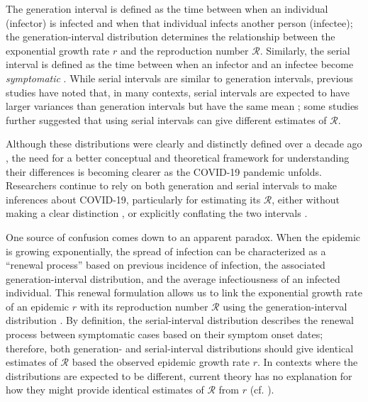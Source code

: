 \documentclass[12pt]{article}
\newcommand{\RR}{\ensuremath{{\mathcal R}}\xspace}
\begin{document}
The generation interval is defined as the time between when an individual (infector) is infected and when that individual infects another person (infectee);
the generation-interval distribution determines the relationship between the exponential growth rate $r$ and the reproduction number \RR \citep{anderson1991infectious, ferguson2005strategies, wallinga2007generation}.
Similarly, the serial interval is defined as the time between when an infector and an infectee become \emph{symptomatic} \citep{svensson2007note}.
While serial intervals are similar to generation intervals, previous studies have noted that, in many contexts, serial intervals are expected to have larger variances than generation intervals but have the same mean \citep{svensson2007note,klinkenberg2011correlation,te2013estimating,champredon2018equivalence};
some studies further suggested that using serial intervals can give different estimates of \RR \citep{britton2019estimation, ganyani2020estimating}.

Although these distributions were clearly and distinctly defined over a decade ago \citep{svensson2007note}, 
the need for a better conceptual and theoretical framework for understanding their differences is becoming clearer as the COVID-19 pandemic unfolds.
Researchers continue to rely on both generation and serial intervals to make inferences about COVID-19, particularly for estimating its \RR, either without making a clear distinction \citep{tempvar,du2020serial,he2020temporal,wu2020nowcasting,zhao2020serial}, or explicitly conflating the two intervals
\citep{anderson2020will,hellewell2020feasibility}.

One source of confusion comes down to an apparent paradox.
When the epidemic is growing exponentially, the spread of infection can be characterized as a ``renewal process'' based on previous incidence of infection, the associated generation-interval distribution, and the average infectiousness of an infected individual.
This renewal formulation allows us to link the exponential growth rate of an epidemic $r$ with its reproduction number \RR using the generation-interval distribution \citep{wallinga2007generation}.
By definition, the serial-interval distribution describes the renewal process between symptomatic cases based on their symptom onset dates;
therefore, both generation- and serial-interval distributions should give identical estimates of  \RR based the observed epidemic growth rate $r$.
In contexts where the distributions are expected to be different, current theory has no explanation for how they might provide identical estimates of \RR from $r$ (cf. \cite{britton2019estimation}).
\end{document}
